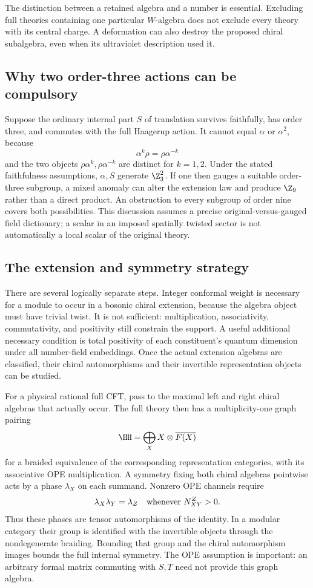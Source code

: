 The distinction between a retained algebra and a number is
essential. Excluding full theories containing one particular
$W$-algebra does not exclude every theory with its central charge.
A deformation can also destroy the proposed chiral subalgebra,
even when its ultraviolet description used it.

\subsection{Why two order-three actions can be compulsory}

Suppose the ordinary internal part $S$ of translation survives
faithfully, has order three, and commutes with the full Haagerup action. It cannot
equal $\alpha$ or $\alpha^2$, because
\[
 \alpha^k\rho=\rho\alpha^{-k}
\]
and the two objects $\rho\alpha^k,\rho\alpha^{-k}$ are distinct
for $k=1,2$. Under the stated faithfulness assumptions,
$\alpha,S$ generate $\Z_3^2$. If one then gauges a suitable
order-three subgroup, a mixed anomaly can alter the extension law
and produce $\Z_9$ rather than a direct product. An obstruction
to every subgroup of order nine covers both possibilities. This
discussion assumes a precise original-versus-gauged field
dictionary; a scalar in an imposed spatially twisted sector is
not automatically a local scalar of the original theory.

\subsection{The extension and symmetry strategy}

There are several logically separate steps. Integer conformal
weight is necessary for a module to occur in a bosonic chiral
extension, because the algebra object must have trivial twist.
It is not sufficient: multiplication, associativity, commutativity,
and positivity still constrain the support. A useful additional
necessary condition is total positivity of each constituent's
quantum dimension under all number-field embeddings. Once the
actual extension algebras are classified, their chiral
automorphisms and their invertible representation objects can be
studied.

For a physical rational full CFT, pass to the maximal left and
right chiral algebras that actually occur. The full theory then
has a multiplicity-one graph pairing
\[
 \HH=\bigoplus_X X\otimes\overline{F(X)}
\]
for a braided equivalence of the corresponding representation
categories, with its associative OPE multiplication. A symmetry
fixing both chiral algebras pointwise acts by a phase $\lambda_X$
on each summand. Nonzero OPE channels require
\[
 \lambda_X\lambda_Y=\lambda_Z
 \quad\hbox{whenever }N_{XY}^{Z}>0.
\]
Thus these phases are tensor automorphisms of the identity. In a
modular category their group is identified with the invertible
objects through the nondegenerate braiding. Bounding that group
and the chiral automorphism images bounds the full internal
symmetry. The OPE assumption is important: an arbitrary formal
matrix commuting with $S,T$ need not provide this graph algebra.

